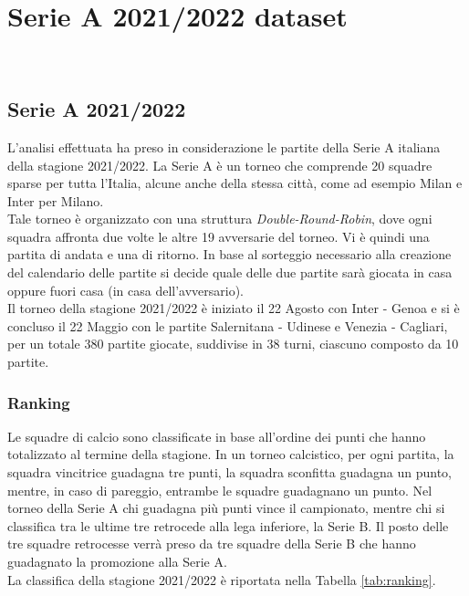 
\chapter{Serie A 2021/2022 dataset }
\label{cap:dataset}

\\

\section{Serie A 2021/2022}

L'analisi effettuata ha preso in considerazione le partite della Serie A italiana della stagione 2021/2022. La Serie A è un torneo che comprende 20 squadre sparse per tutta l'Italia, alcune anche della stessa città, come ad esempio Milan e Inter per Milano. \\
Tale torneo è organizzato con una struttura \emph{Double-Round-Robin}, dove ogni squadra affronta due volte le altre 19 avversarie del torneo. Vi è quindi una partita di andata e una di ritorno. In base al sorteggio necessario alla creazione del calendario delle partite si decide quale delle due partite sarà giocata in casa oppure fuori casa (in casa dell'avversario). \\
Il torneo della stagione 2021/2022 è iniziato il 22 Agosto con Inter - Genoa e si è concluso il 22 Maggio con le partite Salernitana - Udinese e Venezia - Cagliari, per un totale 380 partite giocate, suddivise in 38 turni, ciascuno composto da 10 partite.

\subsection{Ranking}
Le squadre di calcio sono classificate in base all'ordine dei punti che hanno totalizzato al termine della stagione. In un torneo calcistico, per ogni partita, la squadra vincitrice guadagna tre punti, la squadra sconfitta guadagna un punto, mentre, in caso di pareggio, entrambe le squadre guadagnano un punto. Nel torneo della Serie A chi guadagna più punti vince il campionato, mentre chi si classifica tra le ultime tre retrocede alla lega inferiore, la Serie B. Il posto delle tre squadre retrocesse verrà preso da tre squadre della Serie B che hanno guadagnato la promozione alla Serie A.\\ 
La classifica della stagione 2021/2022 è riportata nella Tabella \ref{tab:ranking}.

